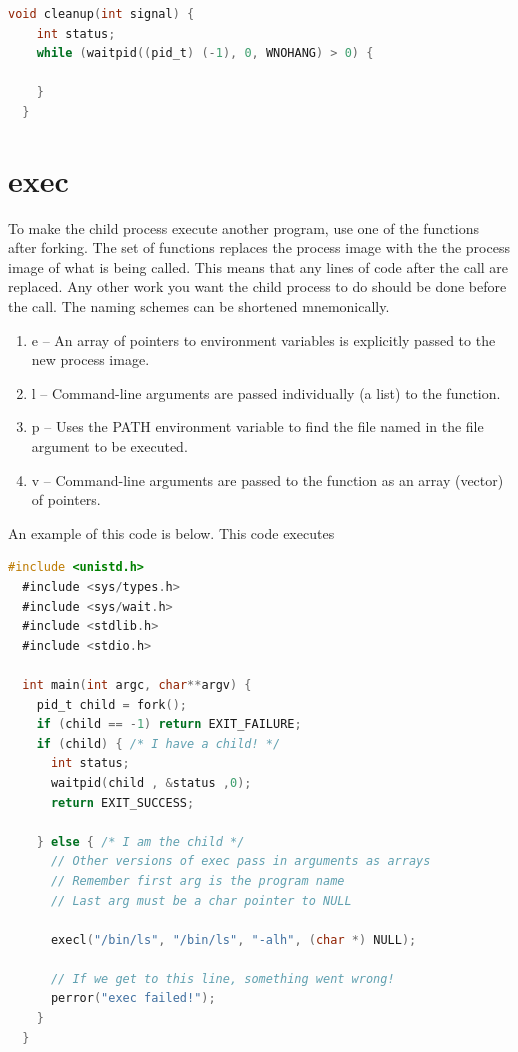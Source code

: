 \begin{lstlisting}[language=C]
  void cleanup(int signal) {
    int status;
    while (waitpid((pid_t) (-1), 0, WNOHANG) > 0) {

    }
  }
\end{lstlisting}

\section{exec}

To make the child process execute another program, use one of the \href{http://man7.org/linux/man-pages/man3/exec.3.html}{} functions after forking.
The  set of functions replaces the process image with the the process image of what is being called.
This means that any lines of code after the  call are replaced.
Any other work you want the child process to do should be done before the  call.
The naming schemes can be shortened mnemonically.

\begin{enumerate}
\item e -- An array of pointers to environment variables is explicitly passed to the new process image.
\item l -- Command-line arguments are passed individually (a list) to the function.
\item p -- Uses the PATH environment variable to find the file named in the file argument to be executed.
\item v -- Command-line arguments are passed to the function as an array (vector) of pointers.
\end{enumerate}

An example of this code is below. This code executes 

\begin{lstlisting}[language=C]
  #include <unistd.h>
  #include <sys/types.h>
  #include <sys/wait.h>
  #include <stdlib.h>
  #include <stdio.h>

  int main(int argc, char**argv) {
    pid_t child = fork();
    if (child == -1) return EXIT_FAILURE;
    if (child) { /* I have a child! */
      int status;
      waitpid(child , &status ,0);
      return EXIT_SUCCESS;

    } else { /* I am the child */
      // Other versions of exec pass in arguments as arrays
      // Remember first arg is the program name
      // Last arg must be a char pointer to NULL

      execl("/bin/ls", "/bin/ls", "-alh", (char *) NULL);

      // If we get to this line, something went wrong!
      perror("exec failed!");
    }
  }
\end{lstlisting}

